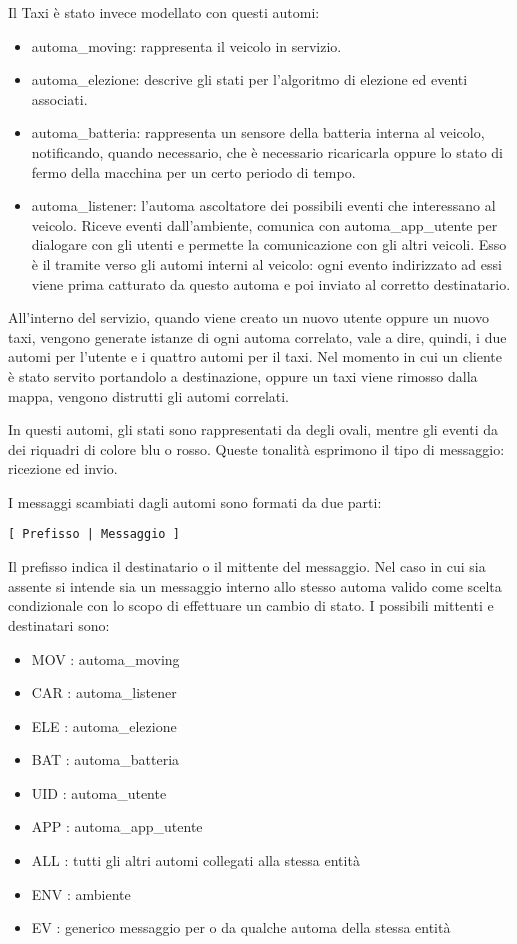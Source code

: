 Il Taxi è stato invece modellato con questi automi:
\begin{itemize} 
 \item automa\_moving: rappresenta il veicolo in servizio.
 \item automa\_elezione: descrive gli stati per l'algoritmo di elezione ed eventi associati. 
 \item automa\_batteria: rappresenta un sensore della batteria interna al veicolo, notificando, quando necessario, che è necessario ricaricarla oppure lo stato di fermo della macchina per un certo periodo di tempo.
 \item automa\_listener: l'automa ascoltatore dei possibili eventi che interessano al veicolo. Riceve eventi dall'ambiente, comunica con automa\_app\_utente per dialogare con gli utenti e permette la comunicazione con gli altri veicoli. Esso è il tramite verso gli automi interni al veicolo: ogni evento indirizzato ad essi viene prima catturato da questo automa e poi inviato al corretto destinatario.
\end{itemize} 

All'interno del servizio, quando viene creato un nuovo utente oppure un nuovo taxi, vengono generate istanze di ogni automa correlato, vale a dire, quindi, i due automi per l'utente e i quattro automi per il taxi. Nel momento in cui un cliente è stato servito portandolo a destinazione, oppure un taxi viene rimosso dalla mappa, vengono distrutti gli automi correlati.

In questi automi, gli stati sono rappresentati da degli ovali, mentre gli eventi da dei riquadri di colore blu o rosso. Queste tonalità esprimono il tipo di messaggio: ricezione ed invio.

I messaggi scambiati dagli automi sono formati da due parti:
\begin{lstlisting} 
[ Prefisso | Messaggio ]
\end{lstlisting}

Il prefisso indica il destinatario o il mittente del messaggio. Nel caso in cui sia assente si intende sia un messaggio interno allo stesso automa valido come scelta condizionale con lo scopo di effettuare un cambio di stato. I possibili mittenti e destinatari sono:

\begin{itemize}
	\item MOV : automa\_moving
	\item CAR : automa\_listener
	\item ELE : automa\_elezione
	\item BAT :	automa\_batteria
	\item UID : automa\_utente
	\item APP : automa\_app\_utente
	\item ALL : tutti gli altri automi collegati alla stessa entità
	\item ENV : ambiente
	\item EV  : generico messaggio per o da qualche automa della stessa entità
\end{itemize}

